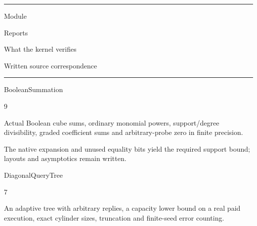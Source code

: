 \documentclass[11pt,a4paper]{article}
\newlength{\OfflineResearchTableWidth}
\newcommand{\OfflineResearchHeaderRule}{\noindent\rule{\linewidth}{0.45pt}\par}
\newcommand{\OfflineResearchRow}{\par}
\newenvironment{OfflineResearchTable}{%
  \par\medskip\begingroup\small\setlength{\parindent}{0pt}%
  \setlength{\parskip}{3pt plus 1pt minus .5pt}%
  \setlength{\OfflineResearchTableWidth}{\linewidth}%
}{%
  \par\endgroup\medskip%
}
\begin{document}
\begin{OfflineResearchTable}
\OfflineResearchHeaderRule
\noindent%
\begin{minipage}[t]{0.23625\OfflineResearchTableWidth}\raggedright
Module
\end{minipage}\hfill%
\begin{minipage}[t]{0.08505\OfflineResearchTableWidth}\raggedright
Reports
\end{minipage}\hfill%
\begin{minipage}[t]{0.31185\OfflineResearchTableWidth}\raggedright
What the kernel verifies
\end{minipage}\hfill%
\begin{minipage}[t]{0.31185\OfflineResearchTableWidth}\raggedright
Written source correspondence
\end{minipage}%
\OfflineResearchRow
\nobreak
\OfflineResearchHeaderRule
\nobreak
\noindent%
\begin{minipage}[t]{0.23625\OfflineResearchTableWidth}\raggedright
BooleanSummation
\end{minipage}\hfill%
\begin{minipage}[t]{0.08505\OfflineResearchTableWidth}\raggedright
9
\end{minipage}\hfill%
\begin{minipage}[t]{0.31185\OfflineResearchTableWidth}\raggedright
Actual Boolean cube sums, ordinary monomial
powers, support/degree divisibility, graded coefficient sums and
arbitrary-probe zero in finite precision.
\end{minipage}\hfill%
\begin{minipage}[t]{0.31185\OfflineResearchTableWidth}\raggedright
The native expansion and
unused equality bits yield the required support bound; layouts and
asymptotics remain written.
\end{minipage}%
\OfflineResearchRow
\noindent%
\begin{minipage}[t]{0.23625\OfflineResearchTableWidth}\raggedright
DiagonalQueryTree
\end{minipage}\hfill%
\begin{minipage}[t]{0.08505\OfflineResearchTableWidth}\raggedright
7
\end{minipage}\hfill%
\begin{minipage}[t]{0.31185\OfflineResearchTableWidth}\raggedright
An adaptive tree with arbitrary replies, a
capacity lower bound on a real paid execution, exact cylinder sizes,
truncation and finite-seed error counting.
\end{minipage}\hfill%
\begin{minipage}[t]{0.31185\OfflineResearchTableWidth}\raggedright

\end{minipage}
\end{OfflineResearchTable}
\end{document}
